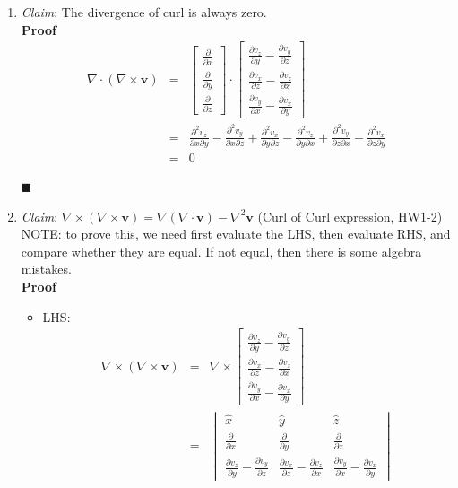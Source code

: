 \documentclass[12pt,a4paper,twoside]{article}
\numberwithin{equation}{section}
\begin{document}
	\begin{enumerate}
		\item \textit{Claim}: The divergence of curl is always zero.\\
		\textbf{Proof}
		\begin{eqnarray*}
			\nabla \cdot (\nabla \times \textbf{v}) &=& \begin{bmatrix}\frac{\partial}{\partial x}\\\frac{\partial}{\partial y} \\\frac{\partial}{\partial z} \end{bmatrix}\cdot \begin{bmatrix}\frac{\partial v_z}{\partial y}-\frac{\partial v_y}{\partial z}\\\frac{\partial v_x}{\partial z}-\frac{\partial v_z}{\partial x}\\\frac{\partial v_y}{\partial x}-\frac{\partial v_x}{\partial y}\end{bmatrix}\\
			&=& \frac{\partial^2v_z}{\partial x\partial y}-\frac{\partial^2 v_y}{\partial x\partial z}+\frac{\partial^2 v_x}{\partial y\partial z}-\frac{\partial^2 v_z}{\partial y\partial x}+\frac{\partial^2 v_y}{\partial z\partial x}-\frac{\partial^2 v_x}{\partial z\partial y}\\
			&=& 0
		\end{eqnarray*}
		\begin{flushright}
			$\blacksquare$
		\end{flushright}
		
		\item \textit{Claim}: \(\nabla \times (\nabla\times \textbf{v})=\nabla (\nabla\cdot \textbf{v})-\nabla^2\textbf{v}\) (Curl of Curl expression, HW1-2)\\
		
		NOTE: to prove this, we need first evaluate the LHS, then evaluate RHS, and compare whether they are equal. If not equal, then there is some algebra mistakes.\\
		
		\textbf{Proof}
		\begin{itemize}
			\item LHS:
			\begin{eqnarray*}
				\nabla \times (\nabla \times \textbf{v}) &=& \nabla \times \begin{bmatrix}\frac{\partial v_z}{\partial y}-\frac{\partial v_y}{\partial z}\\\frac{\partial v_x}{\partial z}-\frac{\partial v_z}{\partial x}\\\frac{\partial v_y}{\partial x}-\frac{\partial v_x}{\partial y}\end{bmatrix}\\
				&=& \begin{vmatrix}
					\hat{x}	& \hat{y} & \hat{z} \\ 
					\frac{\partial}{\partial x}	&\frac{\partial}{\partial y}  & \frac{\partial}{\partial z}\\ 
					\frac{\partial v_z}{\partial y}-\frac{\partial v_y}{\partial z}	&\frac{\partial v_x}{\partial z}-\frac{\partial v_z}{\partial x}  & \frac{\partial v_y}{\partial x}-\frac{\partial v_x}{\partial y}
					

\end{vmatrix}
\end{eqnarray*}
\end{itemize}
\end{enumerate}
\end{document}
